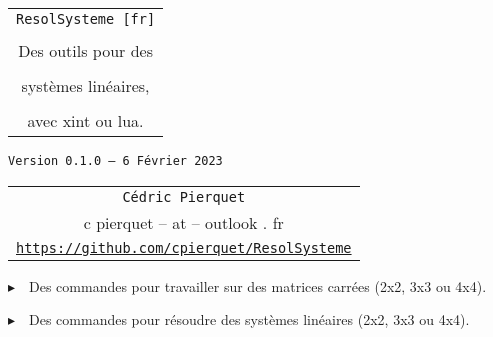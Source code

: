 \documentclass[a4paper,11pt]{article}
\def\TPversion{0.1.0}
\def\TPdate{6 Février 2023}
\begin{document}
\pagestyle{fancy}

\thispagestyle{empty}

\vspace{2cm}

\begin{center}
	\begin{minipage}{0.75\linewidth}
	\begin{tcolorbox}[colframe=yellow,colback=yellow!15]
		\begin{center}
			\begin{tabular}{c}
				{\Huge \texttt{ResolSysteme [fr]}}\\
				\\
				{\LARGE Des outils pour des} \\
				\\
				{\LARGE systèmes linéaires,} \\
				\\
				{\LARGE avec xint ou lua.} \\
			\end{tabular}
			
			\bigskip
			
			{\small \texttt{Version \TPversion{} -- \TPdate}}
		\end{center}
	\end{tcolorbox}
\end{minipage}
\end{center}

\vspace{0.5cm}

\begin{center}
	\begin{tabular}{c}
	\texttt{Cédric Pierquet}\\
	{\ttfamily c pierquet -- at -- outlook . fr}\\
	\texttt{\url{https://github.com/cpierquet/ResolSysteme}}
\end{tabular}
\end{center}

\vspace{0.25cm}

{$\blacktriangleright$~~Des commandes pour travailler sur des matrices carrées (2x2, 3x3 ou 4x4).}

\smallskip

{$\blacktriangleright$~~Des commandes pour résoudre des systèmes linéaires (2x2, 3x3 ou 4x4).}

\smallskip

\vspace{1cm}
\end{document}
